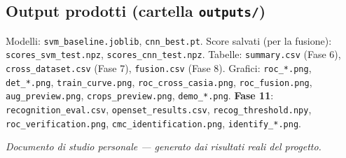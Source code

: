 \documentclass[11pt,a4paper]{article}
\begin{document}
\subsection*{Output prodotti (cartella \texttt{outputs/})}
\footnotesize
Modelli: \texttt{svm\_baseline.joblib}, \texttt{cnn\_best.pt}.
Score salvati (per la fusione): \texttt{scores\_svm\_test.npz}, \texttt{scores\_cnn\_test.npz}.
Tabelle: \texttt{summary.csv} (Fase 6), \texttt{cross\_dataset.csv} (Fase 7), \texttt{fusion.csv} (Fase 8).
Grafici: \texttt{roc\_*.png}, \texttt{det\_*.png}, \texttt{train\_curve.png}, \texttt{roc\_cross\_casia.png},
\texttt{roc\_fusion.png}, \texttt{aug\_preview.png}, \texttt{crops\_preview.png}, \texttt{demo\_*.png}.
\textbf{Fase 11}: \texttt{recognition\_eval.csv}, \texttt{openset\_results.csv},
\texttt{recog\_threshold.npy}, \texttt{roc\_verification.png}, \texttt{cmc\_identification.png},
\texttt{identify\_*.png}.
\normalsize

\vfill
\begin{center}\small\itshape
Documento di studio personale --- generato dai risultati reali del progetto.
\end{center}
\end{document}
